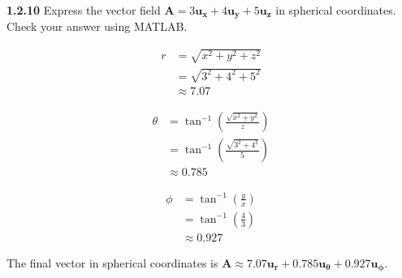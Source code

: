 \documentclass{article}
\begin{document}
\textbf{1.2.10} Express the vector field $\mathbf{A} = 3\mathbf{u_x} + 4\mathbf{u_y} + 5\mathbf{u_z}$ in spherical
coordinates. Check your answer using MATLAB.\@

\begin{equation*}
	\begin{split}
		r & = \sqrt{x^2 + y^2 + z^2} \\
		& = \sqrt{3^2 + 4^2 + 5^2} \\
		& \approx 7.07
	\end{split}
\end{equation*}

\begin{equation*}
	\begin{split}
		\theta & = \tan^{-1}\left(\frac{\sqrt{x^2 + y^2}}{z}\right) \\
		& = \tan^{-1}\left(\frac{\sqrt{3^2 + 4^2}}{5}\right) \\
		& \approx 0.785
	\end{split}
\end{equation*}

\begin{equation*}
	\begin{split}
		\phi & = \tan^{-1}\left(\frac{y}{x}\right) \\
		& = \tan^{-1}\left(\frac{4}{3}\right) \\
		& \approx 0.927
	\end{split}
\end{equation*}

The final vector in spherical coordinates is $\mathbf{A} \approx 7.07\mathbf{u_r} + 0.785\mathbf{u_\theta} +
	0.927\mathbf{u_\phi}$.
\end{document}
